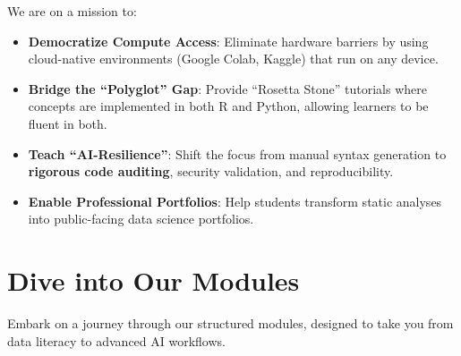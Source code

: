 \documentclass[
  letterpaper,
  DIV=11,
  numbers=noendperiod,
  oneside]{scrreprt}
\providecommand{\tightlist}{%
  \setlength{\itemsep}{0pt}\setlength{\parskip}{0pt}}
\begin{document}

We are on a mission to:

\begin{itemize}
\tightlist
\item
  \textbf{Democratize Compute Access}: Eliminate hardware barriers by
  using cloud-native environments (Google Colab, Kaggle) that run on any
  device.
\item
  \textbf{Bridge the ``Polyglot'' Gap}: Provide ``Rosetta Stone''
  tutorials where concepts are implemented in both R and Python,
  allowing learners to be fluent in both.
\item
  \textbf{Teach ``AI-Resilience''}: Shift the focus from manual syntax
  generation to \textbf{rigorous code auditing}, security validation,
  and reproducibility.
\item
  \textbf{Enable Professional Portfolios}: Help students transform
  static analyses into public-facing data science portfolios.
\end{itemize}

\section*{Dive into Our Modules}\label{dive-into-our-modules}


Embark on a journey through our structured modules, designed to take you
from data literacy to advanced AI workflows.
\end{document}
